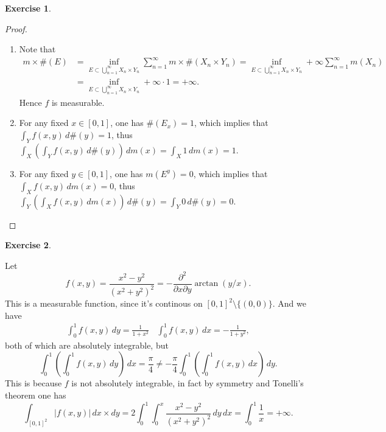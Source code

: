 \documentclass[a4paper]{article}
\newtheorem{ex}{Exercise}[subsection]
\begin{document}
\begin{ex}\end{ex}\begin{proof}\ 
\begin{enumerate}[label = (\roman*)]
    \item Note that \begin{align*}
    m \times \#(E) &= \inf_{E \subset \bigcup_{n = 1}^\infty X_n \times Y_n}\sum_{n = 1}^\infty m \times \#(X_n \times Y_n)
    = \inf_{E \subset \bigcup_{n = 1}^\infty X_n \times Y_n} +\infty \sum_{n = 1}^\infty m(X_n) \\
    &= \inf_{E \subset \bigcup_{n = 1}^\infty X_n \times Y_n} +\infty \cdot 1 = +\infty.
    \end{align*}
    Hence $f$ is measurable.
    \item For any fixed $x \in [0, 1]$, one has $\#(E_x) = 1$, which implies that $\int_Y f(x, y)\,d \#(y) = 1$, thus
    $\int_X (\int_Y f(x, y)\,d \#(y))\,dm(x) = \int_X 1\,dm(x) = 1$.
    \item For any fixed $y \in [0, 1]$, one has $m(E^y) = 0$, which implies that $\int_X f(x, y)\,dm(x) = 0$, thus 
    $\int_Y (\int_X f(x, y)\,dm(x))\,d\#(y) = \int_Y 0\,d\#(y) = 0$.
    
\end{enumerate}
\end{proof}

\begin{ex}\end{ex} Let $$
f(x, y) = \frac{x^2 - y^2}{(x^2 + y^2)^2} = -\frac{\partial^2}{\partial x\partial y}\arctan(y / x).
$$This is a measurable function, since it's continous on $[0, 1]^2 \setminus \{(0, 0)\}$. And we have \begin{align*}
\int_0^1 f(x, y)\,dy = \frac{1}{1 + x^2}\ \ \ \ \int_0^1 f(x, y)\,dx = -\frac{1}{1 + y^2},
\end{align*}both of which are absolutely integrable, but $$
\int_0^1(\int_0^1 f(x, y)\,dy)\,dx = \frac{\pi}{4} \not= -\frac{\pi}{4} \int_0^1 (\int_0^1 f(x, y)\,dx)\,dy.
$$This is because $f$ is not absolutely integrable, in fact by symmetry and Tonelli's theorem one has $$
\int_{[0, 1]^2} |f(x, y)|\,dx \times dy = 2\int_0^1 \int_0^x \frac{x^2 - y^2}{(x^2 + y^2)^2}\,dy\,dx = \int_0^1 \frac{1}{x}
= +\infty.
$$
\end{document}
